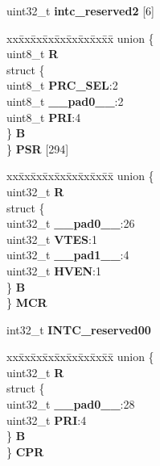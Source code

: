 \begin{DoxyCompactItemize}
\begin{tabbing}
\end{tabbing}\item 
\mbox{\label{structINTC__tag_a1c62770298d458dd31a89449ba314182}} 
uint32\+\_\+t {\bfseries intc\+\_\+reserved2} \mbox{[}6\mbox{]}
\item 
\mbox{\label{structINTC__tag_a3301f5da4bc35fd6c304b817dfcf5778}} 
\begin{tabbing}
xx\=xx\=xx\=xx\=xx\=xx\=xx\=xx\=xx\=\kill
union \{\\
\>uint8\_t {\bfseries R}\\
\>struct \{\\
\>\>uint8\_t {\bfseries PRC\_SEL}:2\\
\>\>uint8\_t {\bfseries \_\_pad0\_\_}:2\\
\>\>uint8\_t {\bfseries PRI}:4\\
\>\} {\bfseries B}\\
\} {\bfseries PSR} \mbox{[}294\mbox{]}\\

\end{tabbing}\item 
\mbox{\label{structINTC__tag_aa2b6d97f5a54bbbb4f3f297d3641445f}} 
\begin{tabbing}
xx\=xx\=xx\=xx\=xx\=xx\=xx\=xx\=xx\=\kill
union \{\\
\>uint32\_t {\bfseries R}\\
\>struct \{\\
\>\>uint32\_t {\bfseries \_\_pad0\_\_}:26\\
\>\>uint32\_t {\bfseries VTES}:1\\
\>\>uint32\_t {\bfseries \_\_pad1\_\_}:4\\
\>\>uint32\_t {\bfseries HVEN}:1\\
\>\} {\bfseries B}\\
\} {\bfseries MCR}\\

\end{tabbing}\item 
\mbox{\label{structINTC__tag_a033c1ed23b5969e4601183a2280e1556}} 
int32\+\_\+t {\bfseries I\+N\+T\+C\+\_\+reserved00}
\item 
\mbox{\label{structINTC__tag_a4a287fe1deaaa84bd07c7b91f5eacfe2}} 
\begin{tabbing}
xx\=xx\=xx\=xx\=xx\=xx\=xx\=xx\=xx\=\kill
union \{\\
\>uint32\_t {\bfseries R}\\
\>struct \{\\
\>\>uint32\_t {\bfseries \_\_pad0\_\_}:28\\
\>\>uint32\_t {\bfseries PRI}:4\\
\>\} {\bfseries B}\\
\} {\bfseries CPR}\\


\end{tabbing}
\end{DoxyCompactItemize}
